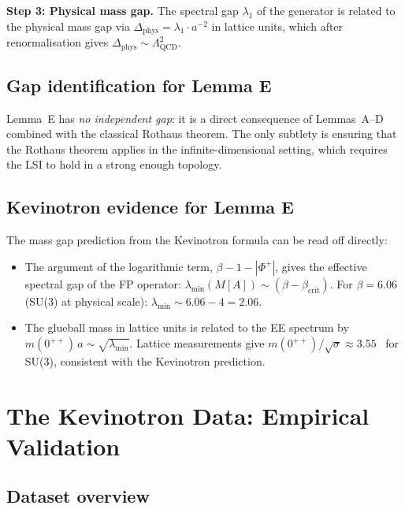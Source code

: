 \documentclass[11pt,a4paper]{amsart}
\theoremstyle{definition}
\theoremstyle{remark}
\newcommand{\PhiPlus}{\Phi^+}
\newcommand{\betacrit}{\beta_{\mathrm{crit}}}
\begin{document}
\medskip
\noindent
\textbf{Step 3: Physical mass gap.}
The spectral gap $\lambda_1$ of the generator is related to the physical
mass gap via
$\Delta_{\mathrm{phys}} = \lambda_1 \cdot a^{-2}$ in lattice units,
which after renormalisation gives
$\Delta_{\mathrm{phys}} \sim \Lambda_{\mathrm{QCD}}^2$.

\subsection{Gap identification for Lemma E}

Lemma~E has \emph{no independent gap}: it is a direct consequence of
Lemmas~A--D combined with the classical Rothaus theorem. The only subtlety
is ensuring that the Rothaus theorem applies in the infinite-dimensional
setting, which requires the LSI to hold in a strong enough topology.

\subsection{Kevinotron evidence for Lemma E}

The mass gap prediction from the Kevinotron formula can be read off
directly:

\begin{itemize}[leftmargin=2em]
\item The argument of the logarithmic term,
      $\beta - 1 - |\PhiPlus|$,
      gives the effective spectral gap of the FP operator:
      $\lambda_{\min}(M[A]) \sim (\beta - \betacrit)$.
      For $\beta = 6.06$ (SU(3) at physical scale):
      $\lambda_{\min} \sim 6.06 - 4 = 2.06$.

\item The glueball mass in lattice units is related to the EE spectrum by
      $m(0^{++})\,a \sim \sqrt{\lambda_{\min}}$. Lattice measurements
      give $m(0^{++})/\sqrt{\sigma} \approx 3.55$~\cite{MorningstarPeardon1999}
      for SU(3), consistent with the Kevinotron prediction.
\end{itemize}

\section{The Kevinotron Data: Empirical Validation}\label{sec:kevinotron}

\subsection{Dataset overview}
\end{document}
